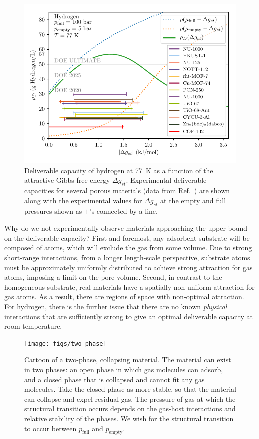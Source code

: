 \documentclass[pre,twocolumn]{revtex4-2}
\newcommand\pfull{\ensuremath{p_{\text{full}}}}
\newcommand\pempty{\ensuremath{p_{\text{empty}}}}
\newcommand\gst{\ensuremath{\Delta g_{st}}}
\begin{document}
\begin{figure}
    \centering
    \includegraphics[width=0.95\columnwidth]{hydrogen-77-n-vs-G}
    \caption{Deliverable capacity of hydrogen at 77\ K as a function of the attractive Gibbs free energy $\gst$. Experimental deliverable capacities for several porous materials (data from Ref.~\cite{garcia2018benchmark, furukawa2009storage}) are shown along with the experimental values for $\gst$ at the empty and full pressures shown as $+$'s connected by a line.}
    \label{fig:hydrogen-77-D}
\end{figure}

Why do we not experimentally observe materials approaching the upper bound on
the deliverable capacity? First and foremost, any adsorbent substrate will be composed of
atoms, which will exclude the gas from some volume. Due to strong short-range
interactions, from a longer length-scale perspective, substrate atoms must be approximately uniformly distributed to achieve strong
attraction for gas atoms, imposing a limit on the pore
volume. Second, in contrast to the homogeneous substrate, real materials have a spatially non-uniform attraction for
gas atoms. As a result, there are regions of space with
non-optimal attraction. For hydrogen, there is the further issue that there are
no known \emph{physical} interactions that are sufficiently strong to give an
optimal deliverable capacity at room temperature.

\begin{figure}
    \centering
    \texttt{[image: figs/two-phase]}
    \caption{Cartoon of a two-phase, collapsing material. The material can exist in two phases: an open phase in which gas molecules can adsorb, and a closed phase that is collapsed and cannot fit any gas molecules. Take the closed phase as more stable, so that the material can collapse and expel residual gas.
    The pressure of gas at which the structural transition occurs depends on the gas-host interactions and relative stability of the phases. We wish for the structural transition to occur between $\pfull$ and $\pempty$.
    }
    \label{fig:flexible-cartoon}
\end{figure}
\end{document}
